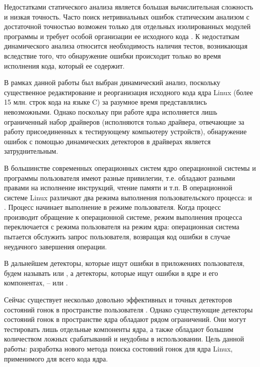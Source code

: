 Недостатками статического анализа является большая вычислительная сложность и низкая точность.
Часто поиск нетривиальных ошибок статическим анализом с достаточной точностью возможен только для отдельных изолированных модулей программы и требует особой организации ее исходного кода \cite{timur}.
К недостаткам динамического анализа относится необходимость наличия тестов, возникающая вследствие того, что обнаружение ошибки происходит только во время исполнения кода, который ее содержит.

В рамках данной работы был выбран динамический анализ, поскольку существенное редактирование и реорганизация исходного кода ядра Linux (более 15 млн. строк кода на языке C) за разумное время представлялись невозможными.
Однако поскольку при работе ядра исполняется лишь ограниченный набор драйверов (исполняются только драйвера, отвечающие за работу присоединенных к тестирующему компьютеру устройств), обнаружение ошибок с помощью динамических детекторов в драйверах является затруднительным.

В большинстве современных операционных систем ядро операционной системы и программы пользователя имеют разные привилегии, т.е. обладают разными правами на исполнение инструкций, чтение памяти и т.п.
В операционной системе Linux различают два режима выполнения пользовательского процесса:  и .
Процесс начинает выполнение в режиме пользователя.
Когда процесс производит обращение к операционной системе, режим выполнения процесса переключается с режима пользователя на режим ядра: операционная система пытается обслужить запрос пользователя, возвращая код ошибки в случае неудачного завершения операции.

В дальнейшем детекторы, которые ищут ошибки в приложениях пользователя, будем называть  или ,
а детекторы, которые ищут ошибки в ядре и его компонентах, --  или .

Сейчас существует несколько довольно эффективных и точных детекторов состояний гонок в пространстве пользователя \cite{tsan, helgrind}.
Однако существующие детекторы состояний гонок в пространстве ядра обладают рядом ограничений.
Они могут тестировать лишь отдельные компоненты ядра, а также обладают большим количеством ложных срабатываний и неудобны в использовании.
Цель данной работы: разработка нового метода поиска состояний гонок для ядра Linux, применимого для всего кода ядра.

